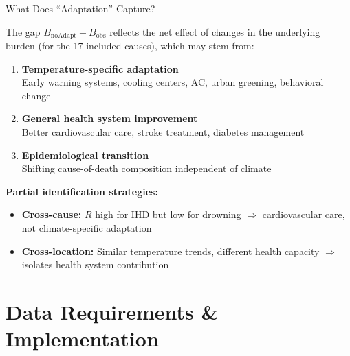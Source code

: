 \documentclass[aspectratio=169,10pt]{beamer}
\begin{document}
\begin{frame}{What Does ``Adaptation'' Capture?}

  The gap $B_{\text{noAdapt}} - B_{\text{obs}}$ reflects the net effect of changes in the underlying burden (for the 17 included causes), which may stem from:

  \begin{enumerate}
    \item \textbf{Temperature-specific adaptation}\\
      Early warning systems, cooling centers, AC, urban greening, behavioral change
    \item \textbf{General health system improvement}\\
      Better cardiovascular care, stroke treatment, diabetes management
    \item \textbf{Epidemiological transition}\\
      Shifting cause-of-death composition independent of climate
  \end{enumerate}

  \vspace{0.5em}
  \textbf{Partial identification strategies:}
  \begin{itemize}
    \item \textbf{Cross-cause:} $R$ high for IHD but low for drowning $\Rightarrow$ cardiovascular care, not climate-specific adaptation
    \item \textbf{Cross-location:} Similar temperature trends, different health capacity $\Rightarrow$ isolates health system contribution
  \end{itemize}
\end{frame}

\section{Data Requirements \& Implementation}
\end{document}
